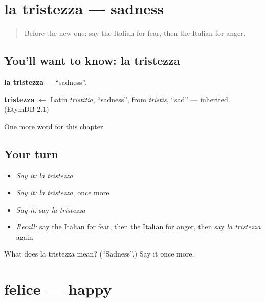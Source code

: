 \section[la tristezza]{la tristezza — sadness}

\label{lesson:IT-C43-tristezza}



\begin{quote}
Before the new one: say the Italian for fear, then the Italian for anger.
\end{quote}

\subsection*{You'll want to know: la tristezza}
\textbf{la tristezza} — \textquotedblleft{}sadness\textquotedblright{}.

\begin{cousinweb}
\textbf{tristezza} $\leftarrow$ Latin \emph{tristitia}, \textquotedblleft{}sadness\textquotedblright{}, from \emph{tristis}, \textquotedblleft{}sad\textquotedblright{} — inherited. (EtymDB 2.1)
\end{cousinweb}

\begin{grammarlens}[title={What you've built}]
One more word for this chapter.
\end{grammarlens}

\subsection*{Your turn}
\begin{itemize}
\raggedright
  \item \emph{Say it:} \emph{la tristezza}
  \item \emph{Say it:} \emph{la tristezza}, once more
  \item \emph{Say it:} say \emph{la tristezza}
  \item \emph{Recall:} say the Italian for fear, then the Italian for anger, then say \emph{la tristezza} again
\end{itemize}

\begin{tcolorbox}[breakable,colback=teal!4,colframe=teal!35!black,title={Before you move on}]
What does la tristezza mean? (\textquotedblleft{}Sadness\textquotedblright{}.) Say it once more.
\end{tcolorbox}
\section[felice]{felice — happy}

